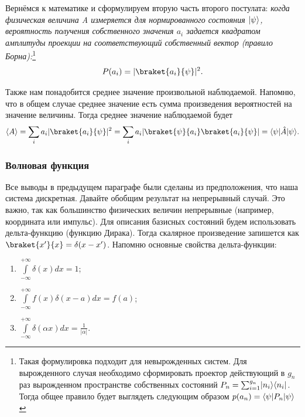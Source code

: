 Вернёмся к математике и сформулируем вторую часть второго постулата:
\textit{когда физическая величина A измеряется для нормированного состояния
  $\lvert\psi\rangle$, вероятность получения собственного значения $a_i$ задается
  квадратом амплитуды проекции на соответствующий собственный вектор (правило
  Борна):}\footnote{Такая формулировка подходит для невырожденных систем. Для
  вырожденного случая необходимо сформировать проектор действующий в $g_n$ раз
  вырожденном пространстве собственных состояний $P_n = \sum_{i=1}^{g_n}
    \lvert n_i\rangle \langle n_i\rvert$. Тогда общее правило будет выглядеть следующим образом
  $p(a_n) = \langle\psi\rvert P_n\lvert\psi\rangle$}
\[
  P(a_i) = |\braket{a_i}{\psi}|^2.
\]

Также нам понадобится среднее значение произвольной наблюдаемой. Напомню, что в
общем случае среднее значение есть сумма произведения вероятностей на значение
величины. Тогда среднее значение наблюдаемой будет
\[
  \mean{A} = \sum_i a_i |\braket{a_i}{\psi}|^2 =
  \sum_i a_i |\braket{\psi}{a_i}\braket{a_i}{\psi}| = \bra{\psi}\hat{A}\ket{\psi}.
\]
\subsubsection*{Волновая функция}
Все выводы в предыдущем параграфе были сделаны из предположения, что наша
система дискретная. Давайте обобщим результат на непрерывный случай. Это важно,
так как большинство физических величин непрерывные (например, координата или
импульс). Для описания базисных состояний будем использовать дельта-функцию
(функцию Дирака). Тогда скалярное произведение запишется как $\braket{x'}{x} =
  \delta(x - x')$. Напомню основные свойства дельта-функции:
\begin{enumerate}
  \item $\int\limits_{-\infty}^{+\infty}\delta(x)dx = 1$;
  \item $\int\limits^{+\infty}_{-\infty}f(x)\delta(x-a)dx = f(a)$;
  \item $\int\limits^{+\infty}_{-\infty}\delta(\alpha x)dx = \frac{1}{|\alpha|}$.
\end{enumerate}


